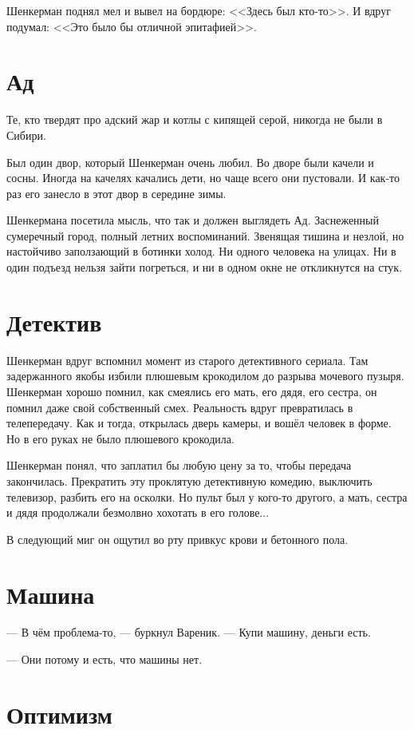 \documentclass[a4paper,10pt,fleqn]{book}\usepackage{polyglossia}\setdefaultlanguage{english}\setotherlanguage{russian}\defaultfontfeatures{Ligatures=TeX,Mapping=tex-text} \usepackage{xcolor}\definecolor{lightgray}{HTML}{bbbbbb}\color{lightgray}\newcommand{\ml}[3]{\textcolor{black}{#3}}
\begin{document}
Шенкерман поднял мел и вывел на бордюре: <<Здесь был кто-то>>.
И вдруг подумал: <<Это было бы отличной эпитафией>>.

\section{Ад}

Те, кто твердят про адский жар и котлы с кипящей серой, никогда не были в Сибири.

Был один двор, который Шенкерман очень любил.
Во дворе были качели и сосны.
Иногда на качелях качались дети, но чаще всего они пустовали.
И как-то раз его занесло в этот двор в середине зимы.

Шенкермана посетила мысль, что так и должен выглядеть Ад. 
Заснеженный сумеречный город, полный летних воспоминаний.
Звенящая тишина и незлой, но настойчиво заползающий в ботинки холод.
Ни одного человека на улицах.
Ни в один подъезд нельзя зайти погреться, и ни в одном окне не откликнутся на стук.

\section{Детектив}

Шенкерман вдруг вспомнил момент из старого детективного сериала.
Там задержанного якобы избили плюшевым крокодилом до разрыва мочевого пузыря.
Шенкерман хорошо помнил, как смеялись его мать, его дядя, его сестра, он помнил даже свой собственный смех.
Реальность вдруг превратилась в телепередачу.
Как и тогда, открылась дверь камеры, и вошёл человек в форме.
Но в его руках не было плюшевого крокодила.

Шенкерман понял, что заплатил бы любую цену за то, чтобы передача закончилась.
Прекратить эту проклятую детективную комедию, выключить телевизор, разбить его на осколки.
Но пульт был у кого-то другого, а мать, сестра и дядя продолжали безмолвно хохотать в его голове...

В следующий миг он ощутил во рту привкус крови и бетонного пола.

\section{Машина}

--- В чём проблема-то, --- буркнул Вареник.
--- Купи машину, деньги есть.

--- Они потому и есть, что машины нет.

\section{Оптимизм}
\end{document}
